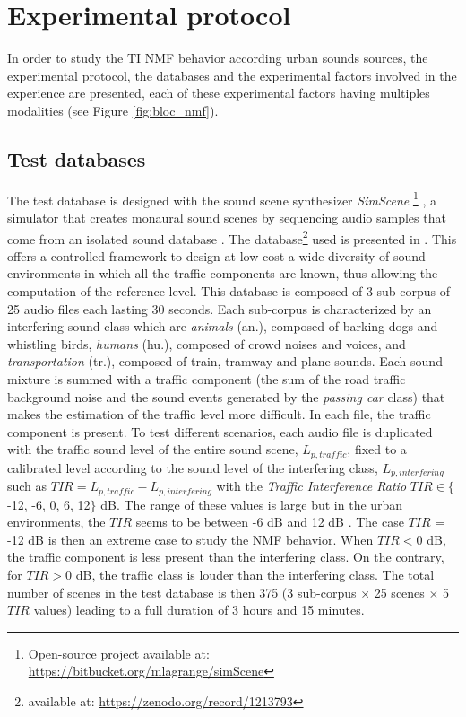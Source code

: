 \documentclass[12pt,english,twoside]{article}
\begin{document}
\section{Experimental protocol}\label{part:protocol}

In order to study the TI NMF behavior according urban sounds sources, the experimental protocol, the databases and the experimental factors involved in the experience are presented, each of these experimental factors having multiples modalities (see Figure \ref{fig:bloc_nmf}).  

\subsection{Test databases}\label{part:test_datase}

The test database is designed with the sound scene synthesizer \textit{SimScene} \footnote{Open-source project available at: \url{https://bitbucket.org/mlagrange/simScene}} \cite{rossignol_simscene_2015}, a simulator that creates monaural sound scenes by sequencing audio samples that come from an isolated sound database \cite{lagrange2015evaluation}. 
The database\footnote{available at: \url{https://zenodo.org/record/1213793}} used is presented in \cite{gloaguen2017creation}. This offers a controlled framework to design at low cost a wide diversity of sound environments in which all the traffic components are known, thus allowing the computation of the reference level.
This database is composed of 3 sub-corpus of 25 audio files each lasting 30 seconds. Each sub-corpus is characterized by an interfering sound class which are \textit{animals} (an.), composed of barking dogs and whistling birds, \textit{humans} (hu.), composed of crowd noises and voices, and \textit{transportation} (tr.), composed of train, tramway and plane sounds. Each sound mixture is summed  with a traffic component (the sum of the road traffic background noise and the sound events generated by the \textit{passing car} class) that makes the estimation of the traffic level more difficult. In each file, the traffic component is present. To test different scenarios, each audio file is duplicated with the traffic sound level of the entire sound scene, $L_{p,traffic}$, fixed to a calibrated level according to the sound level of the interfering class, $L_{p,interfering}$ such as $
TIR = L_{p,traffic}-L_{p,interfering}$ with the \textit{Traffic Interference Ratio} $TIR \in \lbrace$-12, -6, 0, 6, 12$\rbrace$ dB.
The range of these values is large but in the urban environments, the $TIR$ seems to be between -6 dB and 12 dB \cite{gloaguen2017creation}. The case $TIR$ = -12 dB is then an extreme case to study the NMF behavior. When $TIR < 0$ dB, the traffic component is less present than the interfering class. On the contrary, for $TIR > 0$ dB, the traffic class is louder than the interfering class. The total number of scenes in the test database is then 375 (3 sub-corpus $\times$ 25 scenes $\times$  5 $TIR$ values) leading to a full duration of 3 hours and 15 minutes.
\end{document}
